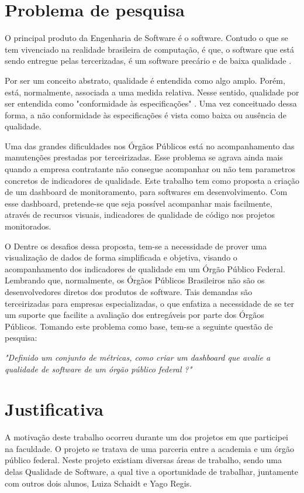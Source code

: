 \section{Problema de pesquisa}
O principal produto da Engenharia de Software é o software. Contudo o que se tem vivenciado na realidade brasileira de computação, é que, o software que está sendo entregue pelas tercerizadas, é um software precário e de baixa qualidade \cite{schnaider_uma_2004}.

 Por ser um conceito abstrato, qualidade é entendida como algo amplo. Porém, está, normalmente, associada a uma medida relativa. Nesse sentido, qualidade por ser entendida como "conformidade às especificações" \cite{crosby}. Uma vez conceituado dessa forma, a não conformidade às especificações é vista como baixa ou ausência de qualidade.

 Uma das grandes dificuldades nos Órgãos Públicos está no acompanhamento das manutenções prestadas por terceirizadas. Esse problema se agrava ainda mais quando a empresa contratante não consegue acompanhar ou não tem parametros concretos de indicadores de qualidade. 
Este trabalho tem como proposta a criação de um dashboard de monitoramento, para softwares em desenvolvimento. Com esse dashboard, pretende-se que seja possível acompanhar mais facilmente, através de recursos visuais, indicadores de qualidade de código nos projetos monitorados.

O Dentre os desafios dessa proposta, tem-se a necessidade de prover uma visualização de dados de forma simplificada e objetiva, visando o acompanhamento dos indicadores de qualidade em um Órgão Público Federal.  Lembrando que, normalmente, os Órgãos Públicos Brasileiros não são os desenvolvedores diretos dos produtos de software. Tais demandas são terceirizadas para empresas especializadas, o que enfatiza a necessidade de se ter um suporte que facilite a avaliação dos entregáveis por parte dos Órgãos Públicos. Tomando este problema como base, tem-se a seguinte questão de pesquisa:
	
	\begin{center}
	\textit{"Definido um conjunto de métricas, como criar um dashboard que avalie a qualidade de software de um órgão público federal ?"}	
	\end{center}

\section{Justificativa}
	A motivação deste trabalho ocorreu durante um dos projetos em que participei na faculdade.  O projeto se tratava de uma parceria entre a academia e um órgão público federal. Neste projeto existiam diversas áreas de trabalho, sendo uma delas Qualidade de Software, a qual tive a oportunidade de trabalhar, juntamente com outros dois alunos, Luiza Schaidt e Yago Regis. 
	

